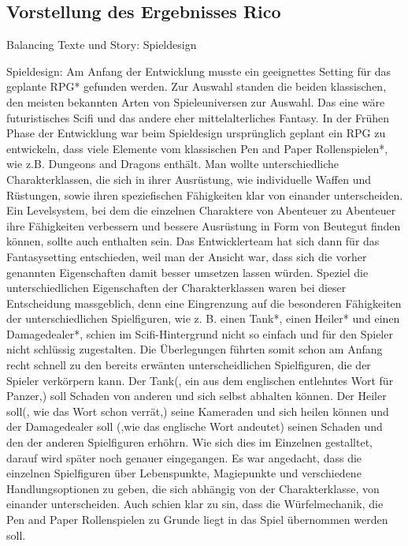 

\subsection{Vorstellung des Ergebnisses Rico}

Balancing 
Texte und Story: Spieldesign 

Spieldesign: Am Anfang der Entwicklung musste ein geeignettes Setting für das geplante RPG* gefunden werden. Zur Auswahl standen die beiden klassischen, den meisten bekannten Arten von Spieleuniversen zur Auswahl. Das eine wäre futuristisches Scifi und das andere eher mittelalterliches Fantasy. In der Frühen Phase der Entwicklung war beim Spieldesign ursprünglich geplant ein RPG zu entwickeln, dass viele Elemente vom klassischen Pen and Paper Rollenspielen*, wie z.B. Dungeons and Dragons enthält. Man wollte unterschiedliche Charakterklassen, die sich in ihrer Ausrüstung, wie individuelle Waffen und Rüstungen, sowie ihren speziefischen Fähigkeiten klar von einander unterscheiden. Ein Levelsystem, bei dem die einzelnen Charaktere von Abenteuer zu Abenteuer ihre Fähigkeiten verbessern und bessere Ausrüstung in Form von Beutegut finden können, sollte auch enthalten sein. Das Entwicklerteam hat sich dann für das Fantasysetting entschieden, weil man der Ansicht war, dass sich die vorher genannten Eigenschaften damit besser umsetzen lassen würden. Speziel die unterschiedlichen Eigenschaften der Charakterklassen waren bei dieser Entscheidung massgeblich, denn eine Eingrenzung auf die besonderen Fähigkeiten der unterschiedlichen Spielfiguren, wie z. B. einen Tank*, einen Heiler* und einen Damagedealer*, schien im Scifi-Hintergrund nicht so einfach und für den Spieler nicht schlüssig zugestalten.
Die Überlegungen führten somit schon am Anfang recht schnell zu den bereits erwänten unterscheidlichen Spielfiguren, die der Spieler verkörpern kann. Der Tank(, ein aus dem englischen entlehntes Wort für Panzer,) soll Schaden von anderen und sich selbst abhalten können. Der Heiler soll(, wie das Wort schon verrät,) seine Kameraden und sich heilen können und der Damagedealer soll (,wie das englische Wort andeutet) seinen Schaden und den der anderen Spielfiguren erhöhrn. Wie sich dies im Einzelnen gestalltet, darauf wird später noch genauer eingegangen. Es war angedacht, dass die einzelnen Spielfiguren über Lebenspunkte, Magiepunkte und verschiedene Handlungsoptionen zu geben, die sich abhängig von der Charakterklasse, von einander unterscheiden. 
Auch schien klar zu sin, dass die Würfelmechanik, die Pen and Paper Rollenspielen zu Grunde liegt in das Spiel übernommen werden soll.
